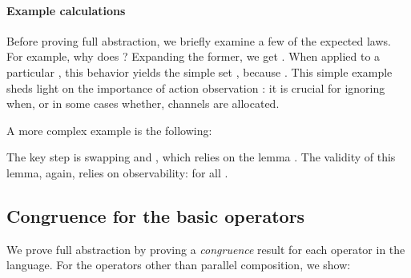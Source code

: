 \documentclass{entcs}
\begin{document}
\paragraph{Example calculations}

Before proving full abstraction, we briefly examine a few of the
expected laws.  For example, why does ?
Expanding the former, we get .  When applied to a particular , this
behavior yields the simple set , because .  This simple example sheds light on the
importance of action observation : it is crucial for ignoring
when, or in some cases whether, channels are allocated.

A more complex example is the following:

The key step is swapping  and , which relies on the
lemma .  The
validity of this lemma, again, relies on observability:  for all .

\subsection{Congruence for the basic operators}

We prove full abstraction by proving a \emph{congruence} result for
each operator in the language.  For the operators other than parallel
composition, we show:
\end{document}
